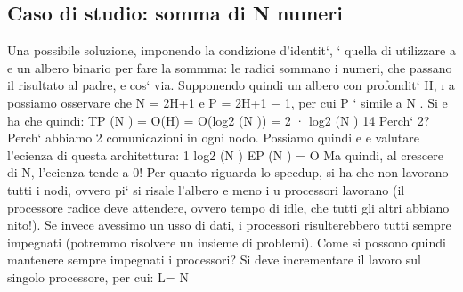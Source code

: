 \documentclass[a4paper,12pt]{article}
\begin{document}
\subsection{Caso di studio: somma di N numeri}
Una possibile soluzione, imponendo la condizione d'identit`, ` quella di utilizzare
a e
un albero binario per fare la sommma: le radici sommano i numeri, che passano
il risultato al padre, e cos` via. Supponendo quindi un albero con profondit` H,
\i{}
a
possiamo osservare che N = 2H+1 e P = 2H+1 $-$ 1, per cui P ` simile a N . Si
e
ha che quindi:
TP (N ) = O(H)
= O(log2 (N ))
= 2 · log2 (N )
14
\newpage
Perch` 2? Perch` abbiamo 2 comunicazioni in ogni nodo. Possiamo quindi
e
e
valutare l'ecienza di questa architettura:
1
log2 (N )
EP (N ) = O
Ma quindi, al crescere di N, l'ecienza tende a 0! Per quanto riguarda lo speedup, si ha che non lavorano tutti i nodi,
ovvero pi` si risale l'albero e meno i
u
processori lavorano (il processore radice deve attendere, ovvero tempo di idle,
che tutti gli altri abbiano nito!). Se invece avessimo un usso di dati, i processori risulterebbero tutti sempre
impegnati (potremmo risolvere un insieme di
problemi).
Come si possono quindi mantenere sempre impegnati i processori? Si deve
incrementare il lavoro sul singolo processore, per cui:
L=
N
\end{document}
